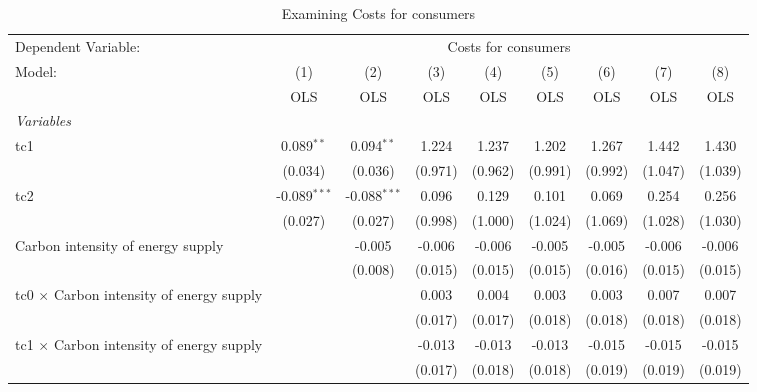 
\begin{table}[htbp]
   \caption{Examining Costs for consumers}
   \centering
   \begin{tabular}{lcccccccc}
      \toprule
      Dependent Variable: & \multicolumn{8}{c}{Costs for consumers}\\
      Model:                                          & (1)            & (2)            & (3)     & (4)     & (5)     & (6)     & (7)     & (8)\\  
                                                      &  OLS           & OLS            & OLS     & OLS     & OLS     & OLS     & OLS     & OLS\\  
      \midrule
      \emph{Variables}\\
      tc1                                             & 0.089$^{**}$   & 0.094$^{**}$   & 1.224   & 1.237   & 1.202   & 1.267   & 1.442   & 1.430\\   
                                                      & (0.034)        & (0.036)        & (0.971) & (0.962) & (0.991) & (0.992) & (1.047) & (1.039)\\   
      tc2                                             & -0.089$^{***}$ & -0.088$^{***}$ & 0.096   & 0.129   & 0.101   & 0.069   & 0.254   & 0.256\\   
                                                      & (0.027)        & (0.027)        & (0.998) & (1.000) & (1.024) & (1.069) & (1.028) & (1.030)\\   
      Carbon intensity of energy supply               &                & -0.005         & -0.006  & -0.006  & -0.005  & -0.005  & -0.006  & -0.006\\   
                                                      &                & (0.008)        & (0.015) & (0.015) & (0.015) & (0.016) & (0.015) & (0.015)\\   
      tc0 $\times$ Carbon intensity of energy supply  &                &                & 0.003   & 0.004   & 0.003   & 0.003   & 0.007   & 0.007\\   
                                                      &                &                & (0.017) & (0.017) & (0.018) & (0.018) & (0.018) & (0.018)\\   
      tc1 $\times$ Carbon intensity of energy supply  &                &                & -0.013  & -0.013  & -0.013  & -0.015  & -0.015  & -0.015\\   
                                                      &                &                & (0.017) & (0.018) & (0.018) & (0.019) & (0.019) & (0.019)\\   

\end{tabular}
\end{table}
